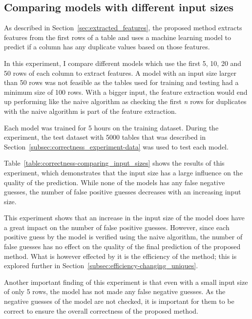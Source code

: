 \subsection{Comparing models with different input sizes}\label{subsec:correctness_comparing-input-size}
As described in Section~\ref{sec:extracted_features}, the proposed method extracts features from the first rows of a table and uses a machine learning model to predict if a column has any duplicate values based on those features. %

In this experiment, I compare different models which use the first \num{5}, \num{10}, \num{20} and \num{50} rows of each column to extract features. A model with an input size larger than \num{50} rows was not feasible as the tables used for training and testing had a minimum size of \num{100} rows. With a bigger input, the feature extraction would end up performing like the naive algorithm as checking the first \textit{n} rows for duplicates with the naive algorithm is part of the feature extraction. %


Each model was trained for \num{5} hours on the training dataset. During the experiment, the test dataset with \num{5000} tables that was described in Section~\ref{subsec:correctness_experiment-data} was used to test each model.

Table~\ref{table:correctness-comparing_input_sizes} shows the results of this experiment, which demonstrates that the input size has a large influence on the quality of the prediction. While none of the models has any false negative guesses, the number of false positive guesses decreases with an increasing input size.


This experiment shows that an increase in the input size of the model does have a great impact on the number of false positive guesses. However, since each positive guess by the model is verified using the naive algorithm, the number of false guesses has no effect on the quality of the final prediction of the proposed method. What is however effected by it is the efficiency of the method; this is explored further in Section~\ref{subsec:efficiency-changing_uniques}.

Another important finding of this experiment is that even with a small input size of only \num{5} rows, the model has not made any false negative guesses. As the negative guesses of the model are not checked, it is important for them to be correct to ensure the overall correctness of the proposed method.

